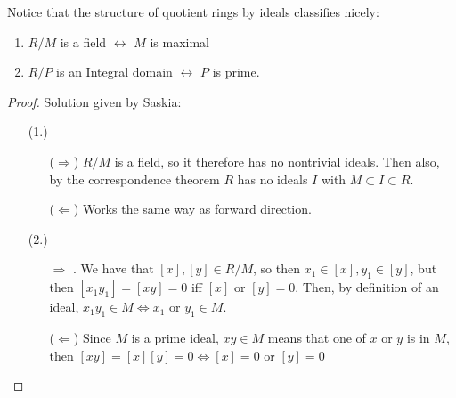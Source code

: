 \documentclass[12pt, twosided]{article}
\begin{document}
Notice that the structure of quotient rings by ideals classifies nicely:

\begin{thm}\label{Ex2} \hspace{0ex}
  \begin{enumerate}
  \item \(R/M\) is a field \(\longleftrightarrow\) \(M\) is maximal
  \item \(R/P\) is an Integral domain \(\longleftrightarrow\) \(P\) is prime.
  \end{enumerate}
\end{thm}
\begin{proof} Solution given by Saskia:
  \begin{enumerate}
  \item [(1.)]\hspace{0ex}
    \begin{enumerate}
    \item [(\(\Rightarrow\))] \(R/M\) is a field, so it therefore has no nontrivial ideals. Then also, by the correspondence theorem \(R\) has no ideals \(I\) with \(M \subset I \subset R\).
    \item [(\(\Leftarrow\))] Works the same way as forward direction.\partdone
    \end{enumerate}
  \item [(2.)]\hspace{0ex}
    \begin{enumerate}
    \item [\(\Rightarrow\)]. We have that \([x],[y] \in R/M\), so then \(x_1 \in [x], y_1 \in [y]\), but then \([x_1y_1] = [xy] = 0\) iff \([x]\) or \([y] = 0\). Then, by definition of an ideal, \(x_1y_1 \in M \Leftrightarrow x_1\) or \(y_1 \in M\).
    \item [(\(\Leftarrow\))] Since \(M\) is a prime ideal, \(xy \in M\) means that one of \(x\) or \(y\) is in \(M\), then \([xy] = [x][y] = 0 \Leftrightarrow [x]=0\) or \([y] = 0\)
    \end{enumerate}
  \end{enumerate}
\end{proof}
\end{document}
